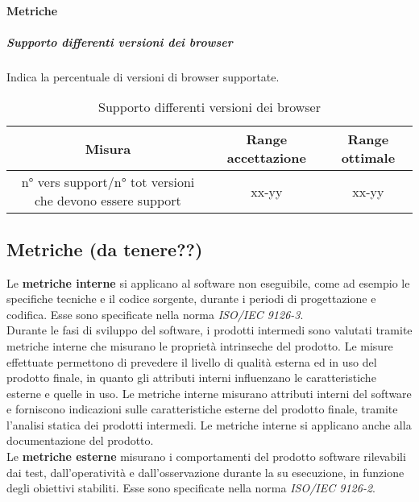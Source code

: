 		\paragraph{Metriche}
			\subparagraph{Supporto differenti versioni dei browser}
			Indica la percentuale di versioni di browser supportate.
			\begin{table}[H]
				\begin{center}
					\begin{tabular}{|c|c|c|}
						\hline
						\textbf{Misura} & \textbf{Range accettazione} & \textbf{Range ottimale} \\
						\hline
						n° vers support/n° tot versioni che devono essere support & xx-yy  & xx-yy \\
						\hline
					\end{tabular}
				\end{center}
				\caption{Supporto differenti versioni dei browser}
			\end{table}
		
	\subsection{Metriche (da tenere??)}
	Le \textbf{metriche interne} si applicano al software non eseguibile, come ad esempio le specifiche tecniche e il codice sorgente, durante i periodi di progettazione e codifica.
	Esse sono specificate nella norma \textit{ISO/IEC 9126-3}.\\
	Durante le fasi di sviluppo del software, i prodotti intermedi sono valutati tramite metriche interne che misurano le proprietà intrinseche del prodotto.
	Le misure effettuate permettono di prevedere il livello di qualità esterna ed in uso del prodotto finale, in quanto gli attributi interni influenzano le caratteristiche esterne e quelle in uso.
	Le metriche interne misurano attributi interni del software e forniscono indicazioni sulle caratteristiche esterne del prodotto finale, tramite l'analisi statica dei prodotti intermedi.
	Le metriche interne si applicano anche alla documentazione del prodotto.\\
	Le \textbf{metriche esterne} misurano i comportamenti del prodotto software rilevabili dai test, dall'operatività e dall'osservazione durante la su esecuzione, in funzione degli obiettivi stabiliti.
	Esse sono specificate nella norma \textit{ISO/IEC 9126-2}.
		
